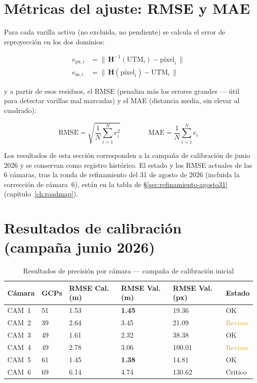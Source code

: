 \section{Métricas del ajuste: RMSE y MAE}

Para cada varilla activa (no excluida, no pendiente) se calcula el error de reproyección en
los dos dominios:

\begin{align}
  e_{\text{px},i} &= \big\| \,\mathbf{H}^{-1}(\text{UTM}_i) - \text{píxel}_i \,\big\| \\
  e_{\text{m},i}  &= \big\| \,\mathbf{H}(\text{píxel}_i) - \text{UTM}_i \,\big\|
\end{align}

y a partir de esos residuos, el RMSE (penaliza más los errores grandes — útil para detectar
varillas mal marcadas) y el MAE (distancia media, sin elevar al cuadrado):

\begin{equation}
  \text{RMSE} = \sqrt{\frac{1}{N}\sum_{i=1}^N e_i^2}
  \qquad\qquad
  \text{MAE} = \frac{1}{N}\sum_{i=1}^N e_i
\end{equation}

\begin{warnbox}
Los resultados de esta sección corresponden a la campaña de calibración de junio 2026 y se
conservan como registro histórico. El estado y los RMSE actuales de las 6 cámaras, tras la
ronda de refinamiento del 31 de agosto de 2026 (incluida la corrección de cámara~6), están en
la tabla de \S\ref{sec:refinamiento-agosto31} (capítulo~\ref{ch:roadmap}).
\end{warnbox}

\section{Resultados de calibración (campaña junio 2026)}

\begin{table}[H]
\centering
\caption{Resultados de precisión por cámara — campaña de calibración inicial}
\label{tab:calibration-results}
\begin{tabular}{C{1.8cm} C{1.8cm} C{2.5cm} C{2.5cm} C{2.5cm} C{2.2cm}}
\toprule
\textbf{Cámara} & \textbf{GCPs} & \textbf{RMSE Cal. (m)} & \textbf{RMSE Val. (m)} & \textbf{RMSE Val. (px)} & \textbf{Estado} \\
\midrule
CAM~1 & 51 & 1.53 & \textbf{1.45} & 19.36 & \textcolor{OliveGreen}{OK} \\
CAM~2 & 39 & 2.64 & 3.45          & 21.09 & \textcolor{Goldenrod}{Revisar} \\
CAM~3 & 49 & 1.61 & 2.32          & 38.38 & \textcolor{OliveGreen}{OK} \\
CAM~4 & 49 & 2.78 & 3.06          & 100.01 & \textcolor{Goldenrod}{Revisar} \\
CAM~5 & 61 & 1.45 & \textbf{1.38} & 14.81 & \textcolor{OliveGreen}{OK} \\
CAM~6 & 69 & 6.14 & 4.74          & 130.62 & \textcolor{BrickRed}{Critico} \\
\bottomrule
\end{tabular}
\end{table}


